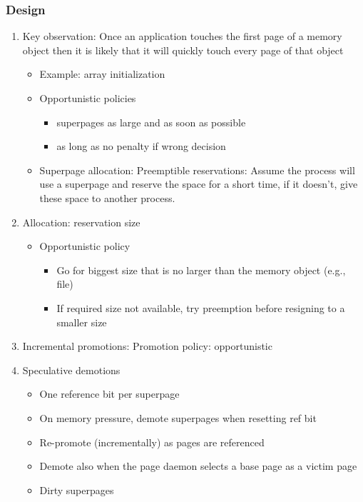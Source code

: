\documentclass[12pt]{article}
\begin{document}
\subsubsection{Design}
\begin{enumerate}
    \item Key observation: Once an application touches the first page of a memory object then it is likely that it will quickly touch every page of that object \begin{itemize}
        \item Example: array initialization
        \item Opportunistic policies \begin{itemize}
            \item superpages as large and as soon as possible
            \item as long as no penalty if wrong decision
        \end{itemize}
        \item Superpage allocation: Preemptible reservations: Assume the process will use a superpage and reserve the space for a short time, if it doesn't, give these space to another process.
    \end{itemize}
    \item Allocation: reservation size \begin{itemize}
        \item Opportunistic policy \begin{itemize}
            \item Go for biggest size that is no larger than the memory object (e.g., file)
            \item If required size not available, try preemption before resigning to a smaller size
        \end{itemize}
    \end{itemize}
    \item Incremental promotions: Promotion policy: opportunistic
    \item Speculative demotions \begin{itemize}
        \item One reference bit per superpage
        \item On memory pressure, demote superpages when resetting ref bit
        \item Re-promote (incrementally) as pages are referenced
        \item Demote also when the page daemon selects a base page as a victim page
        \item Dirty superpages \begin{itemize}

\end{itemize}
\end{itemize}
\end{enumerate}
\end{document}
